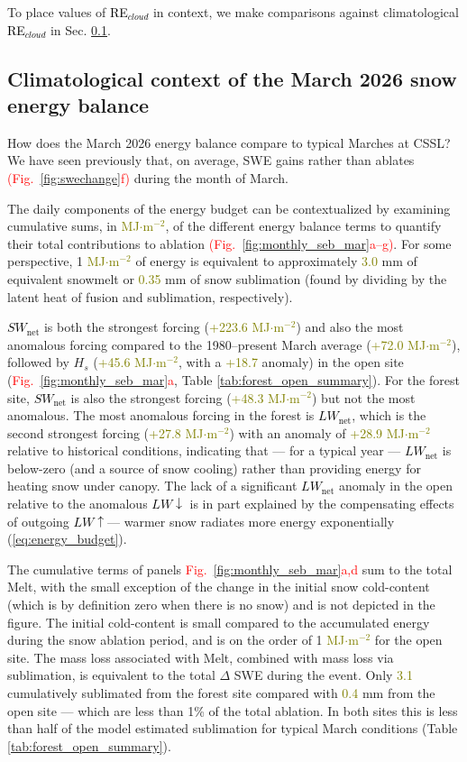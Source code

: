 \documentclass[draft]{agujournal2019}
\newcommand{\fig}[2]{\textcolor{red}{(Fig.~\ref{#1}{#2})}}   %
\newcommand{\fignop}[2]{\textcolor{red}{Fig.~\ref{#1}{#2}}}  %
\newcommand{\mynum}[1]{\textcolor{olive}{#1}}
\newcommand{\lwnet}{\textcolor{black}{$LW_{\mathrm{net}}$}\xspace}
\newcommand{\lwup}{\textcolor{black}{$LW\uparrow$}\xspace}
\newcommand{\lwdn}{\textcolor{black}{$LW\downarrow$}\xspace}
\newcommand{\swnet}{\textcolor{black}{$SW_{\mathrm{net}}$}\xspace}
\newcommand{\rfcirrus}{\textcolor{black}{RE$_{cloud}$}\xspace}
\newcommand{\mjmtwo}{\textcolor{olive}{MJ$\cdot$m$^{-2}$}\xspace}
\begin{document}
To place values of \rfcirrus in context, we make comparisons against climatological \rfcirrus in Sec. \ref{sec:climo_comparison}.




\subsection{Climatological context of the March 2026 snow energy balance}\label{sec:climo_comparison}
%
How does the March 2026 energy balance compare to typical Marches at CSSL?
We have seen previously that, on average, SWE gains rather than ablates \fig{fig:swechange}{f} during the month of March.

The daily components of the energy budget can be contextualized by examining cumulative sums, in \mjmtwo, of the different energy balance terms to quantify their total contributions to ablation \fig{fig:monthly_seb_mar}{a--g}.
For some perspective, 1 \mjmtwo of energy is equivalent to approximately \mynum{3.0} mm of equivalent snowmelt or \mynum{0.35} mm of snow sublimation (found by dividing by the latent heat of fusion and sublimation, respectively).

\swnet is both the strongest forcing (\mynum{+223.6} \mjmtwo) and also the most anomalous forcing compared to the 1980--present March average (\mynum{+72.0} \mjmtwo), followed by $H_s$ (\mynum{+45.6} \mjmtwo, with a \mynum{+18.7} anomaly) in the open site (\fignop{fig:monthly_seb_mar}{a}, Table \ref{tab:forest_open_summary}).
For the forest site, \swnet is also the strongest forcing (\mynum{+48.3} \mjmtwo) but not the most anomalous.
The most anomalous forcing in the forest is \lwnet, which is the second strongest forcing (\mynum{+27.8} \mjmtwo) with an anomaly of \mynum{+28.9} \mjmtwo relative to historical conditions, indicating that --- for a typical year --- \lwnet is below-zero (and a source of snow cooling) rather than providing energy for heating snow under canopy.
The lack of a significant \lwnet anomaly in the open relative to the anomalous \lwdn is in part explained by the compensating effects of outgoing \lwup --- warmer snow radiates more energy exponentially (\ref{eq:energy_budget}).

The cumulative terms of panels \fignop{fig:monthly_seb_mar}{a,d} sum to the total Melt, with the small exception of the change in the initial snow cold-content (which is by definition zero when there is no snow) and is not depicted in the figure.
The initial cold-content is small compared to the accumulated energy during the snow ablation period, and is on the order of 1 \mjmtwo for the open site.
The mass loss associated with Melt, combined with mass loss via sublimation, is equivalent to the total $\Delta$ SWE during the event.
Only \mynum{3.1} cumulatively sublimated from the forest site compared with \mynum{0.4} mm from the open site --- which are less than 1\% of the total ablation.
In both sites this is less than half of the model estimated sublimation for typical March conditions (Table \ref{tab:forest_open_summary}).
\end{document}
